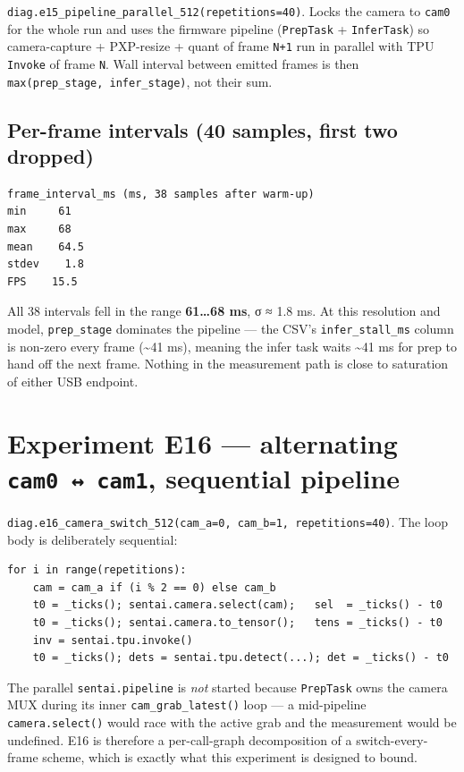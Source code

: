 \texttt{diag.e15\_pipeline\_parallel\_512(repetitions=40)}. Locks the
camera to \texttt{cam0} for the whole run and uses the firmware pipeline
(\texttt{PrepTask} + \texttt{InferTask}) so camera-capture + PXP-resize
+ quant of frame \texttt{N+1} run in parallel with TPU \texttt{Invoke}
of frame \texttt{N}. Wall interval between emitted frames is then
\texttt{max(prep\_stage,\ infer\_stage)}, not their sum.

\subsection{Per-frame intervals (40 samples, first two
dropped)}\label{per-frame-intervals-40-samples-first-two-dropped}

\begin{verbatim}
frame_interval_ms (ms, 38 samples after warm-up)
min     61
max     68
mean    64.5
stdev    1.8
FPS    15.5
\end{verbatim}

All 38 intervals fell in the range \textbf{61\ldots68 ms}, σ ≈ 1.8 ms.
At this resolution and model, \texttt{prep\_stage} dominates the
pipeline --- the CSV's \texttt{infer\_stall\_ms} column is non-zero
every frame (\textasciitilde41 ms), meaning the infer task waits
\textasciitilde41 ms for prep to hand off the next frame. Nothing in the
measurement path is close to saturation of either USB endpoint.

\section{\texorpdfstring{Experiment E16 --- alternating
\texttt{cam0\ ↔\ cam1}, sequential
pipeline}{Experiment E16 --- alternating cam0 ↔ cam1, sequential pipeline}}\label{experiment-e16-alternating-cam0-cam1-sequential-pipeline}

\texttt{diag.e16\_camera\_switch\_512(cam\_a=0,\ cam\_b=1,\ repetitions=40)}.
The loop body is deliberately sequential:

\begin{verbatim}
for i in range(repetitions):
    cam = cam_a if (i % 2 == 0) else cam_b
    t0 = _ticks(); sentai.camera.select(cam);   sel  = _ticks() - t0
    t0 = _ticks(); sentai.camera.to_tensor();   tens = _ticks() - t0
    inv = sentai.tpu.invoke()
    t0 = _ticks(); dets = sentai.tpu.detect(...); det = _ticks() - t0
\end{verbatim}

The parallel \texttt{sentai.pipeline} is \emph{not} started because
\texttt{PrepTask} owns the camera MUX during its inner
\texttt{cam\_grab\_latest()} loop --- a mid-pipeline
\texttt{camera.select()} would race with the active grab and the
measurement would be undefined. E16 is therefore a per-call-graph
decomposition of a switch-every-frame scheme, which is exactly what this
experiment is designed to bound.

